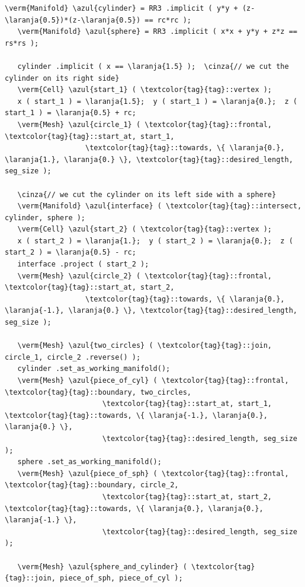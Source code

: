 \begin{Verbatim}[commandchars=\\\{\},formatcom=\small\tt,frame=single,
   label=parag-\ref{\numb section 3.\numb parag 19}.cpp,rulecolor=\color{moldura},
   baselinestretch=0.94,framesep=2mm                                              ]
   \verm{Manifold} \azul{cylinder} = RR3 .implicit ( y*y + (z-\laranja{0.5})*(z-\laranja{0.5}) == rc*rc );
   \verm{Manifold} \azul{sphere} = RR3 .implicit ( x*x + y*y + z*z == rs*rs );

   cylinder .implicit ( x == \laranja{1.5} );  \cinza{// we cut the cylinder on its right side}
   \verm{Cell} \azul{start_1} ( \textcolor{tag}{tag}::vertex );
   x ( start_1 ) = \laranja{1.5};  y ( start_1 ) = \laranja{0.};  z ( start_1 ) = \laranja{0.5} + rc;
   \verm{Mesh} \azul{circle_1} ( \textcolor{tag}{tag}::frontal, \textcolor{tag}{tag}::start_at, start_1,
                   \textcolor{tag}{tag}::towards, \{ \laranja{0.}, \laranja{1.}, \laranja{0.} \}, \textcolor{tag}{tag}::desired_length, seg_size );

   \cinza{// we cut the cylinder on its left side with a sphere}
   \verm{Manifold} \azul{interface} ( \textcolor{tag}{tag}::intersect, cylinder, sphere );
   \verm{Cell} \azul{start_2} ( \textcolor{tag}{tag}::vertex );
   x ( start_2 ) = \laranja{1.};  y ( start_2 ) = \laranja{0.};  z ( start_2 ) = \laranja{0.5} - rc;
   interface .project ( start_2 );
   \verm{Mesh} \azul{circle_2} ( \textcolor{tag}{tag}::frontal, \textcolor{tag}{tag}::start_at, start_2,
                   \textcolor{tag}{tag}::towards, \{ \laranja{0.}, \laranja{-1.}, \laranja{0.} \}, \textcolor{tag}{tag}::desired_length, seg_size );

   \verm{Mesh} \azul{two_circles} ( \textcolor{tag}{tag}::join, circle_1, circle_2 .reverse() );
   cylinder .set_as_working_manifold();
   \verm{Mesh} \azul{piece_of_cyl} ( \textcolor{tag}{tag}::frontal, \textcolor{tag}{tag}::boundary, two_circles,
                       \textcolor{tag}{tag}::start_at, start_1, \textcolor{tag}{tag}::towards, \{ \laranja{-1.}, \laranja{0.}, \laranja{0.} \},
                       \textcolor{tag}{tag}::desired_length, seg_size                         );
   sphere .set_as_working_manifold();
   \verm{Mesh} \azul{piece_of_sph} ( \textcolor{tag}{tag}::frontal, \textcolor{tag}{tag}::boundary, circle_2,
                       \textcolor{tag}{tag}::start_at, start_2, \textcolor{tag}{tag}::towards, \{ \laranja{0.}, \laranja{0.}, \laranja{-1.} \},
                       \textcolor{tag}{tag}::desired_length, seg_size                         );
                       
   \verm{Mesh} \azul{sphere_and_cylinder} ( \textcolor{tag}{tag}::join, piece_of_sph, piece_of_cyl );
\end{Verbatim}

